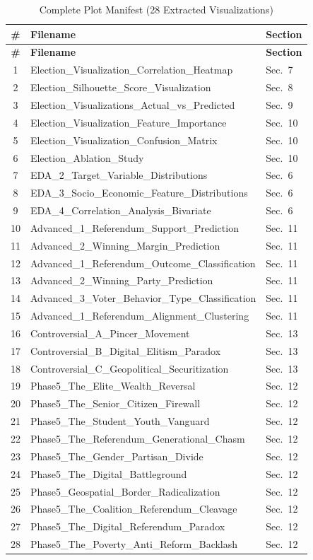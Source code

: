 \documentclass[12pt, a4paper]{article}
\begin{document}
\begin{longtable}{c l l}
\caption{Complete Plot Manifest (28 Extracted Visualizations)} \label{tab:plot_manifest} \\
\toprule
\textbf{\#} & \textbf{Filename} & \textbf{Section} \\
\midrule
\endfirsthead
\toprule
\textbf{\#} & \textbf{Filename} & \textbf{Section} \\
\midrule
\endhead
1 & Election\_Visualization\_Correlation\_Heatmap & Sec.~7 \\
2 & Election\_Silhouette\_Score\_Visualization & Sec.~8 \\
3 & Election\_Visualizations\_Actual\_vs\_Predicted & Sec.~9 \\
4 & Election\_Visualization\_Feature\_Importance & Sec.~10 \\
5 & Election\_Visualization\_Confusion\_Matrix & Sec.~10 \\
6 & Election\_Ablation\_Study & Sec.~10 \\
7 & EDA\_2\_Target\_Variable\_Distributions & Sec.~6 \\
8 & EDA\_3\_Socio\_Economic\_Feature\_Distributions & Sec.~6 \\
9 & EDA\_4\_Correlation\_Analysis\_Bivariate & Sec.~6 \\
10 & Advanced\_1\_Referendum\_Support\_Prediction & Sec.~11 \\
11 & Advanced\_2\_Winning\_Margin\_Prediction & Sec.~11 \\
12 & Advanced\_1\_Referendum\_Outcome\_Classification & Sec.~11 \\
13 & Advanced\_2\_Winning\_Party\_Prediction & Sec.~11 \\
14 & Advanced\_3\_Voter\_Behavior\_Type\_Classification & Sec.~11 \\
15 & Advanced\_1\_Referendum\_Alignment\_Clustering & Sec.~11 \\
16 & Controversial\_A\_Pincer\_Movement & Sec.~13 \\
17 & Controversial\_B\_Digital\_Elitism\_Paradox & Sec.~13 \\
18 & Controversial\_C\_Geopolitical\_Securitization & Sec.~13 \\
19 & Phase5\_The\_Elite\_Wealth\_Reversal & Sec.~12 \\
20 & Phase5\_The\_Senior\_Citizen\_Firewall & Sec.~12 \\
21 & Phase5\_The\_Student\_Youth\_Vanguard & Sec.~12 \\
22 & Phase5\_The\_Referendum\_Generational\_Chasm & Sec.~12 \\
23 & Phase5\_The\_Gender\_Partisan\_Divide & Sec.~12 \\
24 & Phase5\_The\_Digital\_Battleground & Sec.~12 \\
25 & Phase5\_Geospatial\_Border\_Radicalization & Sec.~12 \\
26 & Phase5\_The\_Coalition\_Referendum\_Cleavage & Sec.~12 \\
27 & Phase5\_The\_Digital\_Referendum\_Paradox & Sec.~12 \\
28 & Phase5\_The\_Poverty\_Anti\_Reform\_Backlash & Sec.~12 \\
\bottomrule
\end{longtable}
\end{document}
